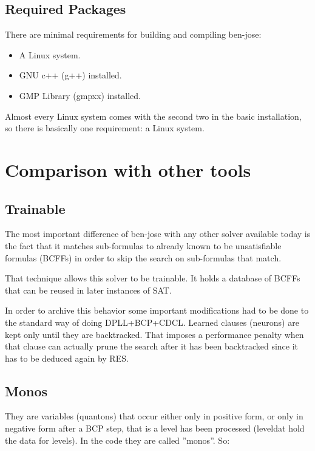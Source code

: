 \documentclass{easychair}
\newcommand{\neuron}{\textsf{neuron}}
\newcommand{\quanton}{\textsf{quanton}}
\newcommand{\leveldat}{\textsf{leveldat}}
\begin{document}
\subsection{Required Packages}

There are minimal requirements for building and compiling ben-jose:

\begin{itemize}
\item
A Linux system.

\item
GNU c++ (g++) installed.

\item
GMP Library (gmpxx) installed.
\end{itemize}

Almost every Linux system comes with the second two in the basic installation, so there is basically one requirement: a Linux system.

\section{Comparison with other tools}
\label{sect:comparison}

\subsection{Trainable}

The most important difference of ben-jose with any other solver available today is the fact that it matches sub-formulas to already known to be unsatisfiable formulas (BCFFs) in order to skip the search on sub-formulas that match.

That technique allows this solver to be trainable. It holds a database of BCFFs that can be reused in later instances of SAT.

In order to archive this behavior some important modifications had to be done to the standard way of doing DPLL+BCP+CDCL. Learned clauses ({\neuron}s) are kept only until they are backtracked. That imposes a performance penalty when that clause can actually prune the search after it has been backtracked since it has to be deduced again by RES.

\subsection{Monos}

They are variables ({\quanton}s) that occur either only in positive form, or only in negative form after a BCP step, that is a level has been processed ({\leveldat} hold the data for levels). In the code they are called ''monos''. So:
\end{document}
